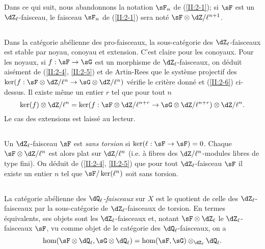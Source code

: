 Dans ce qui suit, nous abandonnons la notation $\sF_n$ de (\ref{II:2-1}); si 
$\sF$ est un $\dZ_\ell$-faisceau, le faisceau $\sF_n$ de (\ref{II:2-1}) sera 
noté $\sF\otimes\dZ/\ell^{n+1}$. 





\subsection{}\label{II:2-7}

Dans la catégorie abélienne des pro-faisceaux, la sous-catégorie des 
$\dZ_\ell$-faisceaux est stable par noyau, conoyau et extension. C'est claire 
pour les conoyaux. Pour les noyaux, si $f:\sF\to\sG$ est un morphisme de 
$\dZ_\ell$-faisceaux, on déduit aisément de (\ref{II:2-4}, \ref{II:2-5}) 
et de Artin-Rees que le système projectif des 
$\ker(f:\sF\otimes\dZ/\ell^n\to\sG\otimes\dZ/\ell^n)$ vérifie le critère 
donné et (\ref{II:2-6}) ci-dessus. Il existe même un entier $r$ tel que pour 
tout $n$ 
\[
  \ker(f)\otimes\dZ/\ell^n = \ker(f:\sF\otimes\dZ/\ell^{n+r}\to\sG\otimes\dZ/\ell^{n+r})\otimes\dZ/\ell^n \text{.}
\]
Le cas des extensions est laissé au lecteur. 





\subsection{}\label{II:2-8}

Un $\dZ_\ell$-faisceau $\sF$ est \emph{sans torsion} si 
$\ker(\ell:\sF\to\sF) = 0$. Chaque $\sF\otimes\dZ/\ell^n$ est alors plat sur 
$\dZ/\ell^n$ (i.e. à fibres des $\dZ/\ell^n$-modules libres de type fini). On 
déduit de (\ref{II:2-4}, \ref{II:2-5}) que pour tout $\dZ_\ell$-faisceau 
$\sF$ il existe un entier $n$ tel que $\sF/\ker(\ell^n)$ soit sans torsion. 





\subsection{}\label{II:2-9}

La catégorie abélienne des \emph{$\dQ_\ell$-faisceaux} sur $X$ est le 
quotient de celle des $\dZ_\ell$-faisceaux par la sous-catégorie de 
$\dZ_\ell$-faisceaux de torsion. En termes équivalents, ses objets sont les 
$\dZ_\ell$-faisceaux et, notant $\sF\otimes\dZ_\ell$ le $\dZ_\ell$-faisceaux 
$\sF$, vu comme objet de le catégorie des $\dQ_\ell$-faisceaux, on a 
\[
  \hom(\sF\otimes\dQ_\ell,\sG\otimes\dQ_\ell) = \hom(\sF,\sG)\otimes_{\dZ_\ell}\dQ_\ell \text{.}
\]

